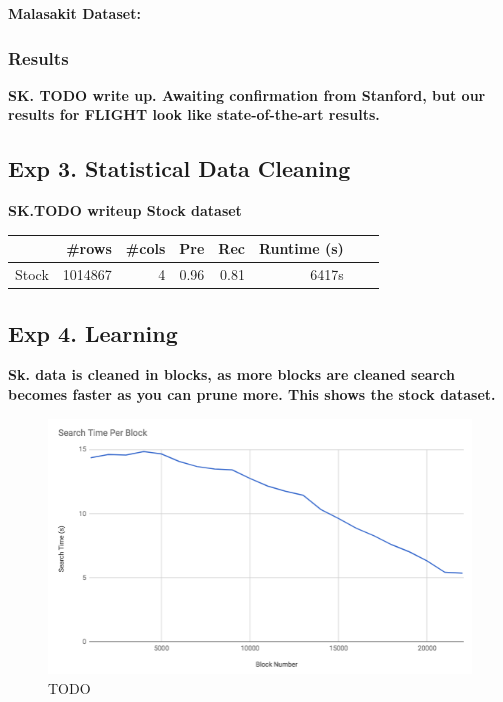 \vspace{0.5em}\noindent\textbf{Malasakit Dataset: }


 
\subsubsection{Results}

\textbf{SK. TODO write up. Awaiting confirmation from Stanford, but our results for FLIGHT look like state-of-the-art results.}






\subsection*{Exp 3. Statistical Data Cleaning}

\textbf{SK.TODO writeup Stock dataset}


\begin{table}[ht]
\centering
\begin{tabular}{|l|r|r|r|r|r|r|r|}
\hline
 & \#rows & \#cols & Pre & Rec & Runtime (s) \\
\hline
Stock	&1014867&4& 0.96&	0.81&	6417s\\
\hline
\end{tabular}
\end{table}



\subsection*{Exp 4. Learning}


\textbf{Sk. data is cleaned in blocks, as more blocks are cleaned search becomes faster as you can prune more. This shows the stock dataset.}

 \begin{figure}[ht]
\centering
 \includegraphics[width=0.9\columnwidth]{figures/draft-blocks.png}
 \caption{TODO
 \label{fig:opt}}
\end{figure}



